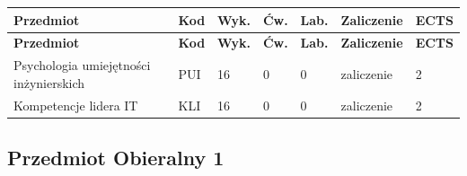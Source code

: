 \documentclass[12pt,a4paper]{article}
\newcommand{\thdrule}{\noalign{\global\setlength{\extrarowheight}{0pt}}}
\newcommand{\thdend}{\noalign{\global\setlength{\extrarowheight}{4pt}}}
\begin{document}
{\scriptsize
\begin{longtable}{m{5.5cm}m{0.8cm}m{1cm}m{1cm}m{1cm}m{1.7cm}m{0.7cm}}
\thdrule\toprule
\rowcolor{pjatkRed}
{\color{white}\footnotesize\textbf{\vphantom{Ag}Przedmiot}} & {\color{white}\footnotesize\textbf{\vphantom{Ag}Kod}} & {\color{white}\footnotesize\textbf{\vphantom{Ag}Wyk.}} & {\color{white}\footnotesize\textbf{\vphantom{Ag}Ćw.}} & {\color{white}\footnotesize\textbf{\vphantom{Ag}Lab.}} & {\color{white}\footnotesize\textbf{\vphantom{Ag}Zaliczenie}} & {\color{white}\footnotesize\textbf{\vphantom{Ag}ECTS}} \\
\midrule\thdend
\endfirsthead
\thdrule\toprule
\rowcolor{pjatkRed}
{\color{white}\footnotesize\textbf{\vphantom{Ag}Przedmiot}} & {\color{white}\footnotesize\textbf{\vphantom{Ag}Kod}} & {\color{white}\footnotesize\textbf{\vphantom{Ag}Wyk.}} & {\color{white}\footnotesize\textbf{\vphantom{Ag}Ćw.}} & {\color{white}\footnotesize\textbf{\vphantom{Ag}Lab.}} & {\color{white}\footnotesize\textbf{\vphantom{Ag}Zaliczenie}} & {\color{white}\footnotesize\textbf{\vphantom{Ag}ECTS}} \\
\midrule\thdend
\endhead
\rowcolor{tableRowLight} Psychologia umiejętności inżynierskich & PUI & 16 & 0 & 0 & {\scriptsize zaliczenie} & 2 \\
\rowcolor{tableRowAlt} Kompetencje lidera IT & KLI & 16 & 0 & 0 & {\scriptsize zaliczenie} & 2 \\
\bottomrule
\end{longtable}}

\subsection*{Przedmiot Obieralny 1}
\end{document}
